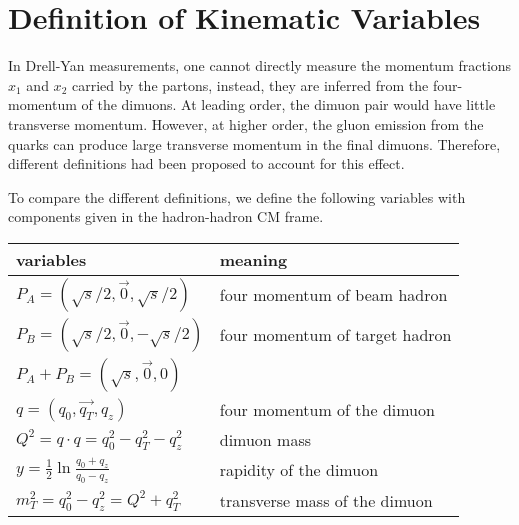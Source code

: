 \documentclass[../main.tex]{subfiles}
\begin{document}
\chapter{Definition of Kinematic Variables}
\label{a_ch:kinematic}
In Drell-Yan measurements, one cannot directly measure the momentum fractions
$x_1$ and $x_2$ carried by the partons, instead, they are inferred from the
four-momentum of the dimuons. At leading order, the dimuon pair would have little
transverse momentum. However, at higher order, the gluon emission from the quarks
can produce large transverse momentum in the final dimuons. Therefore, different
definitions had been proposed to account for this effect.

To compare the different definitions, we define the following variables with
components given in the hadron-hadron CM frame.
\begin{table}[h!]
	\centering
	\begin{tabular}{l|l}
		variables                                                 & meaning                        \\ \hline
		$P_A = \left(   \sqrt{s}/2, \vec{0}, \sqrt{s}/2 \right)$  & four momentum of beam hadron   \\
		$P_B = \left( \sqrt{s}/2, \vec{0},   -\sqrt{s}/2 \right)$ & four momentum of target hadron \\
		$P_A+P_B=\left(\sqrt{s},\vec{0},0\right)$                 &                                \\
		$q = \left(q_0, \vec{q_T}, q_z\right)$                    & four momentum of the dimuon    \\
		$Q^2=q\cdot q=q_0^2-q_T^2-q_z^2$                          & dimuon mass                    \\
		$y=\frac{1}{2}\ln \frac{q_0 +   q_z}{q_0-q_z}$            & rapidity of the dimuon         \\
		$m_T^2 = q_0^2 - q_z^2=Q^2+q_T^2$                         & transverse mass of the dimuon  \\ \hline
	\end{tabular}
\end{table}
\end{document}
